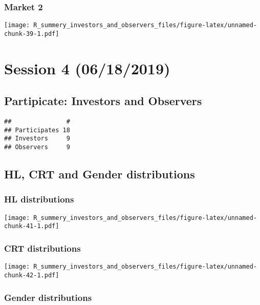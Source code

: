 \documentclass[]{article}
\begin{document}
\hypertarget{market-2-2}{%
\subsubsection{Market 2}\label{market-2-2}}

\texttt{[image: R\_summery\_investors\_and\_observers\_files/figure-latex/unnamed-chunk-39-1.pdf]}

\hypertarget{session-4-06182019}{%
\section{Session 4 (06/18/2019)}\label{session-4-06182019}}

\hypertarget{partipicate-investors-and-observers-3}{%
\subsection{Partipicate: Investors and
Observers}\label{partipicate-investors-and-observers-3}}

\begin{verbatim}
##               #
## Participates 18
## Investors     9
## Observers     9
\end{verbatim}

\hypertarget{hl-crt-and-gender-distributions-3}{%
\subsection{HL, CRT and Gender
distributions}\label{hl-crt-and-gender-distributions-3}}

\hypertarget{hl-distributions-3}{%
\subsubsection{HL distributions}\label{hl-distributions-3}}

\texttt{[image: R\_summery\_investors\_and\_observers\_files/figure-latex/unnamed-chunk-41-1.pdf]}

\hypertarget{crt-distributions-3}{%
\subsubsection{CRT distributions}\label{crt-distributions-3}}

\texttt{[image: R\_summery\_investors\_and\_observers\_files/figure-latex/unnamed-chunk-42-1.pdf]}

\hypertarget{gender-distributions-3}{%
\subsubsection{Gender distributions}\label{gender-distributions-3}}
\end{document}
